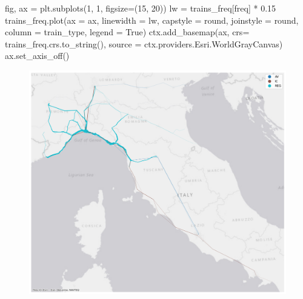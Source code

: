 \documentclass[
  letterpaper,
  DIV=11,
  numbers=noendperiod]{scrreprt}
\newenvironment{Shaded}{\begin{snugshade}}{\end{snugshade}}
\newcommand{\DecValTok}[1]{\textcolor[rgb]{0.68,0.00,0.00}{#1}}
\newcommand{\FloatTok}[1]{\textcolor[rgb]{0.68,0.00,0.00}{#1}}
\newcommand{\NormalTok}[1]{\textcolor[rgb]{0.00,0.23,0.31}{#1}}
\newcommand{\OperatorTok}[1]{\textcolor[rgb]{0.37,0.37,0.37}{#1}}
\newcommand{\StringTok}[1]{\textcolor[rgb]{0.13,0.47,0.30}{#1}}
\newcommand{\VariableTok}[1]{\textcolor[rgb]{0.07,0.07,0.07}{#1}}
\begin{document}
\begin{Shaded}
\begin{Highlighting}[]
\NormalTok{fig, ax }\OperatorTok{=}\NormalTok{ plt.subplots(}\DecValTok{1}\NormalTok{, }\DecValTok{1}\NormalTok{, figsize}\OperatorTok{=}\NormalTok{(}\DecValTok{15}\NormalTok{, }\DecValTok{20}\NormalTok{))}
\NormalTok{lw }\OperatorTok{=}\NormalTok{ trains\_freq[}\StringTok{\textquotesingle{}freq\textquotesingle{}}\NormalTok{] }\OperatorTok{*} \FloatTok{0.15}
\NormalTok{trains\_freq.plot(ax }\OperatorTok{=}\NormalTok{ ax, linewidth }\OperatorTok{=}\NormalTok{ lw, capstyle }\OperatorTok{=} \StringTok{\textquotesingle{}round\textquotesingle{}}\NormalTok{, joinstyle }\OperatorTok{=} \StringTok{\textquotesingle{}round\textquotesingle{}}\NormalTok{, column }\OperatorTok{=} \StringTok{\textquotesingle{}train\_type\textquotesingle{}}\NormalTok{, legend }\OperatorTok{=} \VariableTok{True}\NormalTok{)}
\NormalTok{ctx.add\_basemap(ax, crs}\OperatorTok{=}\NormalTok{ trains\_freq.crs.to\_string(), source }\OperatorTok{=}\NormalTok{ ctx.providers.Esri.WorldGrayCanvas)}
\NormalTok{ax.set\_axis\_off()}
\end{Highlighting}
\end{Shaded}

\begin{figure}[H]

{\centering \includegraphics{labs/w02_maps_files/figure-pdf/cell-56-output-1.png}

}

\end{figure}
\end{document}
